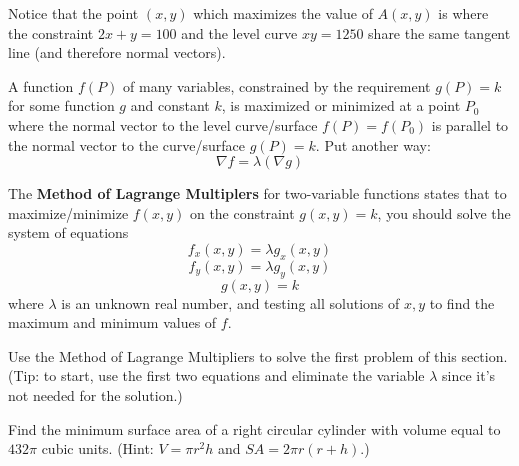\documentclass[letterpaper, twoside, 12pt]{book}
\begin{document}
\begin{remark}
  Notice that the point $(x,y)$ which maximizes the value of $A(x,y)$
  is where the constraint $2x+y=100$ and the level curve $xy=1250$
  share the same tangent line (and therefore normal vectors).
\end{remark}

\begin{theorem}
  A function
  $f(P)$ of many variables, constrained by the requirement
  $g(P)=k$ for some function $g$ and constant $k$, is maximized or
  minimized at a point $P_0$ where the normal vector to the
  level curve/surface $f(P)=f(P_0)$ is parallel to the normal vector
  to the curve/surface $g(P)=k$. Put another way:
  \[
    \nabla f = \lambda(\nabla g)
  \]
\end{theorem}

\begin{theorem}
  The \textbf{Method of Lagrange Multiplers} for two-variable functions
  states that to maximize/minimize $f(x,y)$ on the constraint $g(x,y)=k$,
  you should solve the system of equations
    \[
      f_x(x,y)=\lambda g_x(x,y)
    \]
    \[
      f_y(x,y)=\lambda g_y(x,y)
    \]
    \[
      g(x,y)=k
    \]
  where $\lambda$ is an unknown real number,
  and testing all solutions of $x,y$ to find the maximum
  and minimum values of $f$.
\end{theorem}

          \begin{problem}
            Use the Method of Lagrange Multipliers to solve the first
            problem of this section. (Tip: to start, use the first
            two equations and eliminate the variable $\lambda$ since
            it's not needed for the solution.)
          \end{problem}

          \begin{solution}

          \end{solution}

          \begin{problem}
            Find the minimum surface area of a right circular cylinder
            with volume equal to $432\pi$ cubic units.
            (Hint: $V=\pi r^2h$ and $SA=2\pi r(r+h)$.)
          \end{problem}

          \begin{solution}

          \end{solution}
\end{document}
